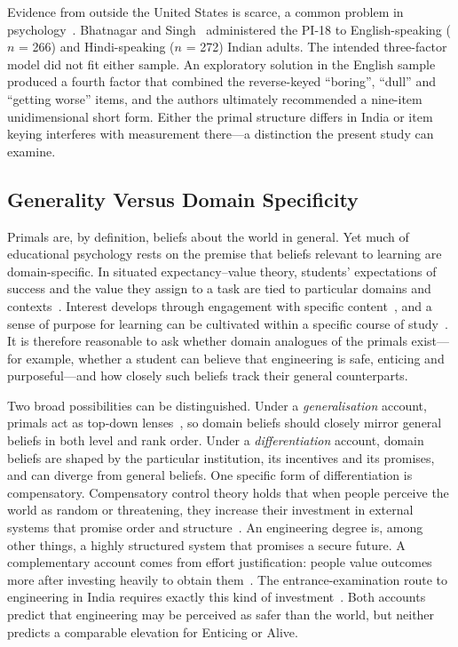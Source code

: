 \documentclass[journal,a4paper]{IEEEtran}
\begin{document}
Evidence from outside the United States is scarce, a common problem in psychology~\cite{henrich2010}. Bhatnagar and Singh~\cite{bhatnagar2024} administered the PI-18 to English-speaking ($n$ = 266) and Hindi-speaking ($n$ = 272) Indian adults. The intended three-factor model did not fit either sample. An exploratory solution in the English sample produced a fourth factor that combined the reverse-keyed ``boring'', ``dull'' and ``getting worse'' items, and the authors ultimately recommended a nine-item unidimensional short form. Either the primal structure differs in India or item keying interferes with measurement there—a distinction the present study can examine.

\subsection{Generality Versus Domain Specificity}

Primals are, by definition, beliefs about the world in general. Yet much of educational psychology rests on the premise that beliefs relevant to learning are domain-specific. In situated expectancy–value theory, students' expectations of success and the value they assign to a task are tied to particular domains and contexts~\cite{eccles2020}. Interest develops through engagement with specific content~\cite{hidi2006}, and a sense of purpose for learning can be cultivated within a specific course of study~\cite{yeager2014}. It is therefore reasonable to ask whether domain analogues of the primals exist—for example, whether a student can believe that engineering is safe, enticing and purposeful—and how closely such beliefs track their general counterparts.

Two broad possibilities can be distinguished. Under a \emph{generalisation} account, primals act as top-down lenses~\cite{clifton2019}, so domain beliefs should closely mirror general beliefs in both level and rank order. Under a \emph{differentiation} account, domain beliefs are shaped by the particular institution, its incentives and its promises, and can diverge from general beliefs. One specific form of differentiation is compensatory. Compensatory control theory holds that when people perceive the world as random or threatening, they increase their investment in external systems that promise order and structure~\cite{kay2008,landau2015}. An engineering degree is, among other things, a highly structured system that promises a secure future. A complementary account comes from effort justification: people value outcomes more after investing heavily to obtain them~\cite{aronson1959}. The entrance-examination route to engineering in India requires exactly this kind of investment~\cite{subramanian2019}. Both accounts predict that engineering may be perceived as safer than the world, but neither predicts a comparable elevation for Enticing or Alive.
\end{document}
